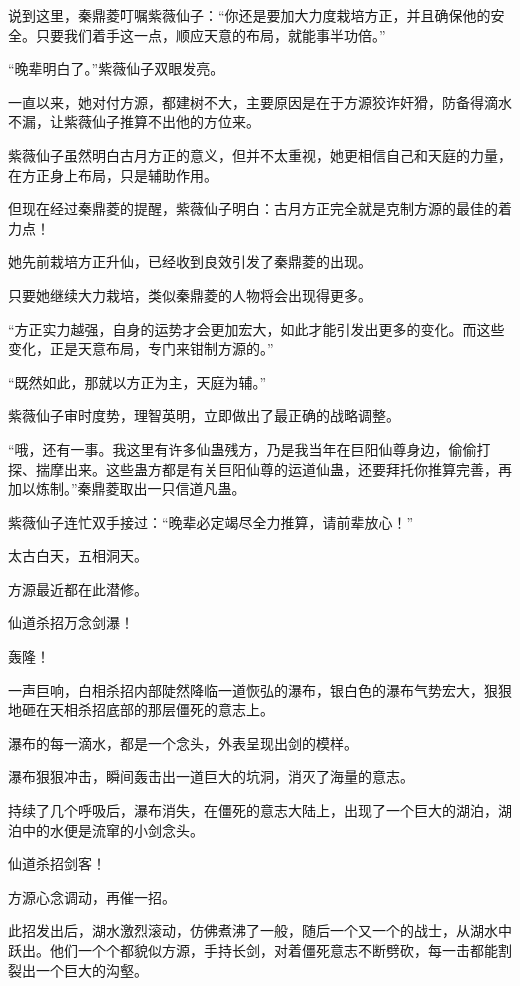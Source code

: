 \begin{this_body}
说到这里，秦鼎菱叮嘱紫薇仙子：“你还是要加大力度栽培方正，并且确保他的安全。只要我们着手这一点，顺应天意的布局，就能事半功倍。”

“晚辈明白了。”紫薇仙子双眼发亮。

一直以来，她对付方源，都建树不大，主要原因是在于方源狡诈奸猾，防备得滴水不漏，让紫薇仙子推算不出他的方位来。

紫薇仙子虽然明白古月方正的意义，但并不太重视，她更相信自己和天庭的力量，在方正身上布局，只是辅助作用。

但现在经过秦鼎菱的提醒，紫薇仙子明白：古月方正完全就是克制方源的最佳的着力点！

她先前栽培方正升仙，已经收到良效引发了秦鼎菱的出现。

只要她继续大力栽培，类似秦鼎菱的人物将会出现得更多。

“方正实力越强，自身的运势才会更加宏大，如此才能引发出更多的变化。而这些变化，正是天意布局，专门来钳制方源的。”

“既然如此，那就以方正为主，天庭为辅。”

紫薇仙子审时度势，理智英明，立即做出了最正确的战略调整。

“哦，还有一事。我这里有许多仙蛊残方，乃是我当年在巨阳仙尊身边，偷偷打探、揣摩出来。这些蛊方都是有关巨阳仙尊的运道仙蛊，还要拜托你推算完善，再加以炼制。”秦鼎菱取出一只信道凡蛊。

紫薇仙子连忙双手接过：“晚辈必定竭尽全力推算，请前辈放心！”

太古白天，五相洞天。

方源最近都在此潜修。

仙道杀招万念剑瀑！

轰隆！

一声巨响，白相杀招内部陡然降临一道恢弘的瀑布，银白色的瀑布气势宏大，狠狠地砸在天相杀招底部的那层僵死的意志上。

瀑布的每一滴水，都是一个念头，外表呈现出剑的模样。

瀑布狠狠冲击，瞬间轰击出一道巨大的坑洞，消灭了海量的意志。

持续了几个呼吸后，瀑布消失，在僵死的意志大陆上，出现了一个巨大的湖泊，湖泊中的水便是流窜的小剑念头。

仙道杀招剑客！

方源心念调动，再催一招。

此招发出后，湖水激烈滚动，仿佛煮沸了一般，随后一个又一个的战士，从湖水中跃出。他们一个个都貌似方源，手持长剑，对着僵死意志不断劈砍，每一击都能割裂出一个巨大的沟壑。


\end{this_body}
